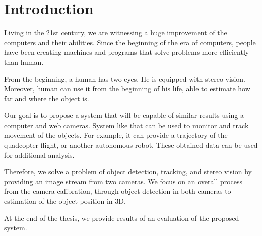 \chapter*{Introduction}

Living in the 21st century, we are witnessing a huge improvement of the
computers and their abilities. Since the beginning of the era of computers,
people have been creating machines and programs that solve problems more
efficiently than human.

From the beginning, a human has two eyes. He is equipped with stereo vision.
Moreover, human can use it from the beginning of his life, able to estimate how
far and where the object is.

Our goal is to propose a system that will be capable of similar results using a
computer and web cameras. System like that can be used to monitor and track
movement of the objects. For example, it can provide a trajectory of the
quadcopter flight, or another autonomous robot. These obtained data can be
used for additional analysis.

Therefore, we solve a problem of object detection, tracking, and stereo vision
by providing an image stream from two cameras. We focus on an overall process
from the camera calibration, through object detection in both cameras to
estimation of the object position in 3D.

At the end of the thesis, we provide results of an evaluation of the proposed
system.
